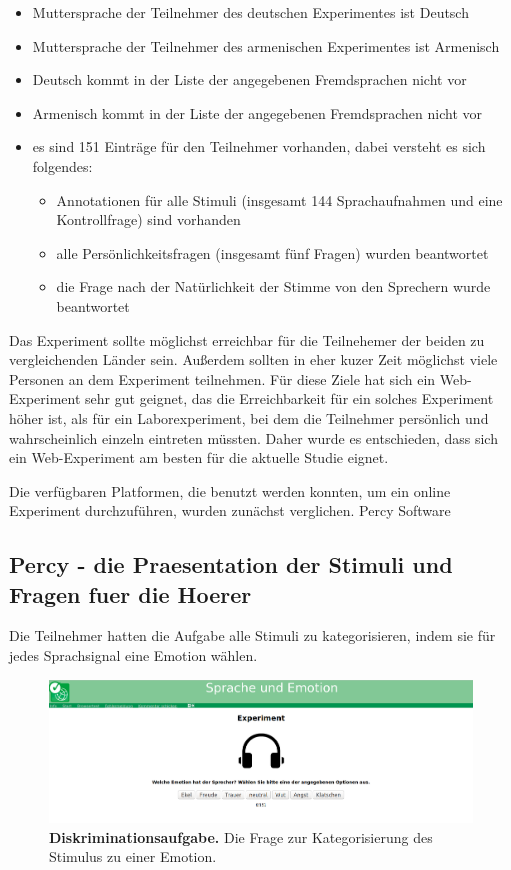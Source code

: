 \documentclass[11pt,a4paper,headsepline,twoside,toc=bibliography]{scrreprt}
\begin{document}
\begin{itemize}
	\item Muttersprache der Teilnehmer des deutschen Experimentes ist Deutsch 
	\item Muttersprache der Teilnehmer des armenischen Experimentes ist Armenisch
	\item Deutsch kommt in der Liste der angegebenen Fremdsprachen nicht vor
	\item Armenisch kommt in der Liste der angegebenen Fremdsprachen nicht vor
	\item es sind 151 Einträge für den Teilnehmer vorhanden, dabei versteht es sich folgendes:
	
	\begin{itemize}	 
		\item Annotationen für alle Stimuli (insgesamt 144 Sprachaufnahmen und eine Kontrollfrage) sind vorhanden
		\item alle Persönlichkeitsfragen (insgesamt fünf Fragen) wurden beantwortet
		\item die Frage nach der Natürlichkeit der Stimme von den Sprechern wurde beantwortet
	\end{itemize}
\end{itemize}



Das Experiment sollte möglichst erreichbar für die Teilnehemer der beiden zu vergleichenden Länder sein. Außerdem sollten in eher kuzer Zeit möglichst viele Personen an dem Experiment teilnehmen. Für diese Ziele hat sich ein Web-Experiment sehr gut geignet, das die Erreichbarkeit für ein solches Experiment höher ist, als für ein Laborexperiment, bei dem die Teilnehmer persönlich und wahrscheinlich einzeln eintreten müssten. Daher wurde es entschieden, dass sich ein Web-Experiment am besten für die aktuelle Studie eignet. 

Die verfügbaren Platformen, die benutzt werden konnten, um ein online Experiment durchzuführen, wurden  zunächst verglichen. Percy Software \parencite{Draxler2011} 


\subsection{Percy - die Praesentation der Stimuli und Fragen fuer die Hoerer}
\label{sec:stimulusobject}

Die Teilnehmer hatten die Aufgabe alle Stimuli zu kategorisieren, indem sie für jedes Sprachsignal eine Emotion wählen. 
\begin{figure}
	\centering
	\includegraphics[width=1\linewidth]{pics/experiment/experiment_active_buttons.png}
	\caption{\textbf{Diskriminationsaufgabe.} Die Frage zur Kategorisierung des Stimulus zu einer Emotion. }
	\label{fig:experiment_question}
\end{figure}
\end{document}
